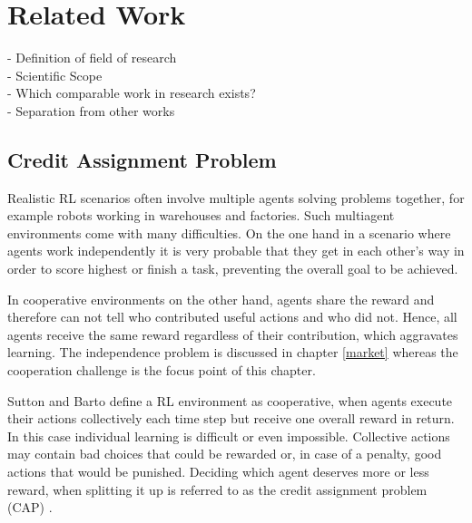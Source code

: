 %
%
\chapter{Related Work}\label{sec:RelatedWork}
- Definition of field of research \\
- Scientific Scope \\
- Which comparable work in research exists? \\
- Separation from other works

\section{Credit Assignment Problem}
Realistic RL scenarios often involve multiple agents solving problems together, for example robots working in warehouses and factories. Such multiagent environments come with many difficulties. On the one hand in a scenario where agents work independently it is very probable that they get in each other's way in order to score highest or finish a task, preventing the overall goal to be achieved.

In cooperative environments on the other hand, agents share the reward and therefore can not tell who contributed useful actions and who did not. Hence, all agents receive the same reward regardless of their contribution, which aggravates learning. The independence problem is discussed in chapter \ref{market} whereas the cooperation challenge is the focus point of this chapter.

Sutton and Barto \cite{suba18} define a RL environment as cooperative, when agents execute their actions collectively each time step but receive one overall reward in return. In this case individual learning is difficult or even impossible. Collective actions may contain bad choices that could be rewarded or, in case of a penalty,  good actions that would be punished. Deciding which agent deserves more or less reward, when splitting it up is referred to as the credit assignment problem (CAP) \cite{mi61}.

